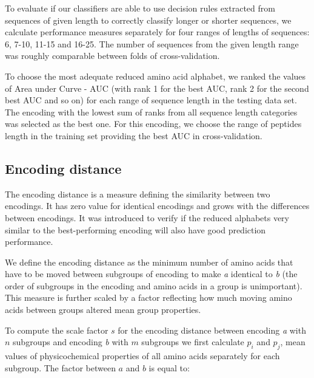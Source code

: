 \documentclass[a4,center,fleqn]{NAR}
\begin{document}
  To evaluate if our classifiers are able to use decision rules extracted from 
sequences of given length to correctly classify longer or shorter sequences, we 
calculate performance measures separately for four ranges of lengths of 
sequences: 6, 7-10, 11-15 and 16-25. The number of sequences from the given 
%
%
%
length range was roughly comparable between folds of cross-validation.
  
  To choose the most adequate reduced amino acid alphabet, we ranked the values 
%
%
%
of Area under Curve - AUC (with rank 1 for the best AUC, rank 2 for the second 
best AUC and so on) for each range of sequence length in the testing data set. 
The encoding with the lowest sum of ranks from all sequence length categories 
was selected as the best one. For this encoding, we choose the range of peptides 
length in the training set providing the best AUC in cross-validation.

\subsection{Encoding distance}
The encoding distance is a measure defining the similarity between two 
encodings. It has zero value for identical encodings and grows with the 
differences between encodings. It was introduced to verify if the reduced 
alphabets very similar to the best-performing encoding will also have good 
prediction performance.

  We define the encoding distance as the minimum number of amino acids that 
have to be moved between subgroups of encoding to make \textit{a} identical to 
\textit{b} (the order of subgroups in the encoding and amino acids in a group 
is unimportant). This measure is further scaled by a factor reflecting how 
much moving amino acids between groups altered mean group properties. 

To compute the scale factor $s$ for the encoding distance between 
encoding \textit{a} with $n$ subgroups and encoding \textit{b} with $m$ 
subgroups we first calculate $p_i$ and $p_j$, mean values of physicochemical 
properties of all amino acids separately for each subgroup. The factor between 
%
%
%
$a$ and $b$ is equal to: 
\end{document}
